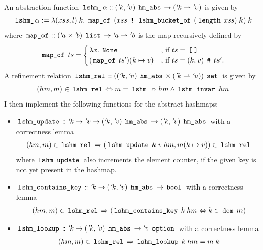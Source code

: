 An abstraction function $\,\text{\ttfamily lshm\_}\,\alpha \mathrel{\mathord{:}\mkern-1.2mu\mathord{:}} ({\mskip2mu '\mskip-2muk},{\mskip2mu '\mskip-2muv})\; \,\text{\ttfamily hm\_abs}\, \rightarrow ({\mskip2mu '\mskip-2muk} \rightharpoonup {\mskip2mu '\mskip-2muv})$ is given by
\begin{align*}
	\,\text{\ttfamily lshm\_}\,\alpha := \lambda (xss,l) \; k. \; \,\text{\ttfamily map\_of}\, \; (xss \; \,\text{\ttfamily !}\, \; \,\text{\ttfamily lshm\_bucket\_of}\, \; (\,\text{\ttfamily length}\, \; xss) \; k) \; k
\end{align*}
where $\,\text{\ttfamily map\_of}\, \mathrel{\mathord{:}\mkern-1.2mu\mathord{:}} ({\mskip2mu '\mskip-2mua} \times {\mskip2mu '\mskip-2mub}) \; \,\text{\ttfamily list}\, \rightarrow {\mskip2mu '\mskip-2mua} \rightharpoonup {\mskip2mu '\mskip-2mub}$ is the map recursively defined by
\begin{gather*}
	\,\text{\ttfamily map\_of}\, \; ts =
	\begin{cases}
		\lambda x. \; \,\text{\ttfamily None}\,            & \text{, if $ts=\,\text{\ttfamily [\;]}\,$}                  \\
		(\,\text{\ttfamily map\_of}\, \; ts')(k \mapsto v) & \text{, if $ts=(k,v) \; \,\text{\ttfamily \#}\, \; ts'$.}
	\end{cases}
\end{gather*}
A refinement relation $\,\text{\ttfamily lshm\_rel}\, \mathrel{\mathord{:}\mkern-1.2mu\mathord{:}} (({\mskip2mu '\mskip-2muk},{\mskip2mu '\mskip-2muv}) \; \,\text{\ttfamily hm\_abs}\, \times ({\mskip2mu '\mskip-2muk} \rightharpoonup {\mskip2mu '\mskip-2muv})) \; \,\text{\ttfamily set}\,$ is given by
\begin{gather*}
	(hm,m) \in \,\text{\ttfamily lshm\_rel}\, \Leftrightarrow m = \,\text{\ttfamily lshm\_}\,\alpha \; hm \land \,\text{\ttfamily lshm\_invar}\, \; hm
\end{gather*}
I then implement the following functions for the abstract hashmaps:
\begin{itemize}
	\item   $\,\text{\ttfamily lshm\_update}\, \mathrel{\mathord{:}\mkern-1.2mu\mathord{:}} {\mskip2mu '\mskip-2muk} \rightarrow {\mskip2mu '\mskip-2muv} \rightarrow ({\mskip2mu '\mskip-2muk},{\mskip2mu '\mskip-2muv}) \; \,\text{\ttfamily hm\_abs}\, \rightarrow ({\mskip2mu '\mskip-2muk},{\mskip2mu '\mskip-2muv}) \; \,\text{\ttfamily hm\_abs}\,$ with a correctness lemma
	      \begin{gather*}
		      (hm,m) \in \,\text{\ttfamily lshm\_rel}\, \Rightarrow (\,\text{\ttfamily lshm\_update}\, \; k \; v \; hm, m(k\mapsto v)) \in \,\text{\ttfamily lshm\_rel}\,
	      \end{gather*}
	      where $\,\text{\ttfamily lshm\_update}\,$ also increments the element counter, if the given key is not yet present in the hashmap.
	\item   $\,\text{\ttfamily lshm\_contains\_key}\, \mathrel{\mathord{:}\mkern-1.2mu\mathord{:}} {\mskip2mu '\mskip-2muk} \rightarrow ({\mskip2mu '\mskip-2muk},{\mskip2mu '\mskip-2muv}) \; \,\text{\ttfamily hm\_abs}\, \rightarrow \,\text{\ttfamily bool}\,$ with a correctness lemma
	      \begin{gather*}
		      (hm,m) \in \,\text{\ttfamily lshm\_rel}\, \Rightarrow (\,\text{\ttfamily lshm\_contains\_key}\, \; k \; hm \Leftrightarrow k \in \,\text{\ttfamily dom}\, \; m)
	      \end{gather*}
	\item   $\,\text{\ttfamily lshm\_lookup}\, \mathrel{\mathord{:}\mkern-1.2mu\mathord{:}} {\mskip2mu '\mskip-2muk} \rightarrow ({\mskip2mu '\mskip-2muk},{\mskip2mu '\mskip-2muv}) \; \,\text{\ttfamily hm\_abs}\, \rightarrow {\mskip2mu '\mskip-2muv} \; \,\text{\ttfamily option}\,$ with a correctness lemma
	      \begin{gather*}
		      (hm,m) \in \,\text{\ttfamily lshm\_rel}\, \Rightarrow \,\text{\ttfamily lshm\_lookup}\, \; k \; hm = m \; k
	      \end{gather*}
\end{itemize}

